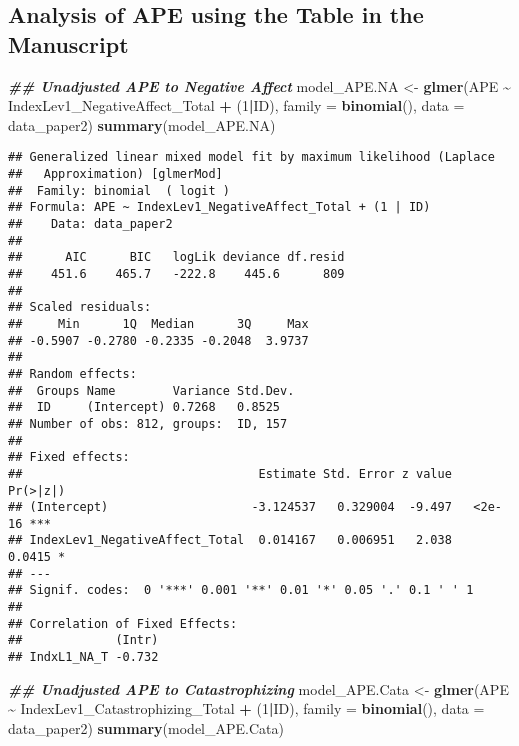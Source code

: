 \documentclass[
  12pt,
]{article}
\newenvironment{Shaded}{\begin{snugshade}}{\end{snugshade}}
\newcommand{\AttributeTok}[1]{\textcolor[rgb]{0.13,0.29,0.53}{#1}}
\newcommand{\DecValTok}[1]{\textcolor[rgb]{0.00,0.00,0.81}{#1}}
\newcommand{\DocumentationTok}[1]{\textcolor[rgb]{0.56,0.35,0.01}{\textbf{\textit{#1}}}}
\newcommand{\FunctionTok}[1]{\textcolor[rgb]{0.13,0.29,0.53}{\textbf{#1}}}
\newcommand{\NormalTok}[1]{#1}
\newcommand{\OtherTok}[1]{\textcolor[rgb]{0.56,0.35,0.01}{#1}}
\newcommand{\SpecialCharTok}[1]{\textcolor[rgb]{0.81,0.36,0.00}{\textbf{#1}}}
\begin{document}
\hypertarget{analysis-of-ape-using-the-table-in-the-manuscript}{%
\subsection{Analysis of APE using the Table in the
Manuscript}\label{analysis-of-ape-using-the-table-in-the-manuscript}}

\begin{Shaded}
\begin{Highlighting}[]
\DocumentationTok{\#\# Unadjusted APE to Negative Affect}
\NormalTok{model\_APE.NA }\OtherTok{\textless{}{-}} \FunctionTok{glmer}\NormalTok{(APE }\SpecialCharTok{\textasciitilde{}}\NormalTok{ IndexLev1\_NegativeAffect\_Total }\SpecialCharTok{+}\NormalTok{ (}\DecValTok{1}\SpecialCharTok{|}\NormalTok{ID), }\AttributeTok{family =} \FunctionTok{binomial}\NormalTok{(), }\AttributeTok{data =}\NormalTok{ data\_paper2)}
\FunctionTok{summary}\NormalTok{(model\_APE.NA)}
\end{Highlighting}
\end{Shaded}

\begin{verbatim}
## Generalized linear mixed model fit by maximum likelihood (Laplace
##   Approximation) [glmerMod]
##  Family: binomial  ( logit )
## Formula: APE ~ IndexLev1_NegativeAffect_Total + (1 | ID)
##    Data: data_paper2
## 
##      AIC      BIC   logLik deviance df.resid 
##    451.6    465.7   -222.8    445.6      809 
## 
## Scaled residuals: 
##     Min      1Q  Median      3Q     Max 
## -0.5907 -0.2780 -0.2335 -0.2048  3.9737 
## 
## Random effects:
##  Groups Name        Variance Std.Dev.
##  ID     (Intercept) 0.7268   0.8525  
## Number of obs: 812, groups:  ID, 157
## 
## Fixed effects:
##                                 Estimate Std. Error z value Pr(>|z|)    
## (Intercept)                    -3.124537   0.329004  -9.497   <2e-16 ***
## IndexLev1_NegativeAffect_Total  0.014167   0.006951   2.038   0.0415 *  
## ---
## Signif. codes:  0 '***' 0.001 '**' 0.01 '*' 0.05 '.' 0.1 ' ' 1
## 
## Correlation of Fixed Effects:
##             (Intr)
## IndxL1_NA_T -0.732
\end{verbatim}

\begin{Shaded}
\begin{Highlighting}[]
 \DocumentationTok{\#\# Unadjusted APE to Catastrophizing}
\NormalTok{model\_APE.Cata }\OtherTok{\textless{}{-}} \FunctionTok{glmer}\NormalTok{(APE }\SpecialCharTok{\textasciitilde{}}\NormalTok{ IndexLev1\_Catastrophizing\_Total }\SpecialCharTok{+}\NormalTok{ (}\DecValTok{1}\SpecialCharTok{|}\NormalTok{ID), }\AttributeTok{family =} \FunctionTok{binomial}\NormalTok{(), }\AttributeTok{data =}\NormalTok{ data\_paper2)}
\FunctionTok{summary}\NormalTok{(model\_APE.Cata)}
\end{Highlighting}
\end{Shaded}
\end{document}
